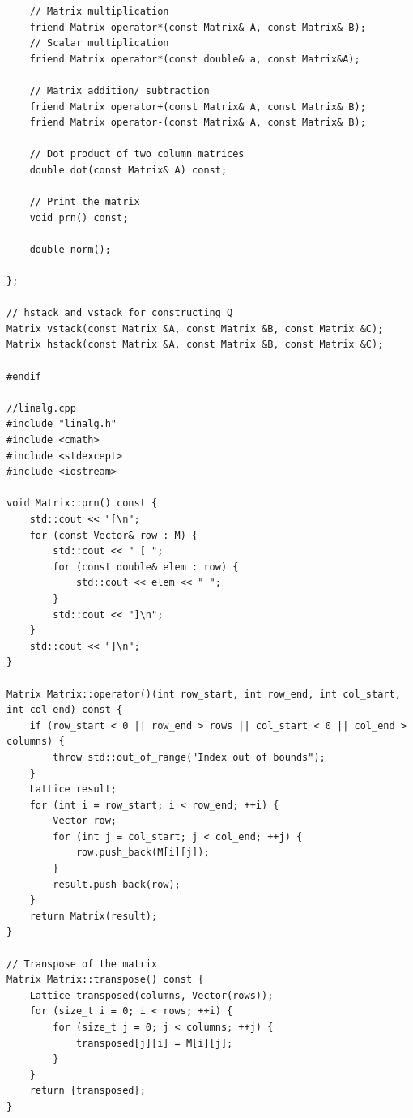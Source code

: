 \documentclass[12pt,twoside]{article}
\begin{document}
\begin{verbatim}
    // Matrix multiplication
    friend Matrix operator*(const Matrix& A, const Matrix& B);
    // Scalar multiplication
    friend Matrix operator*(const double& a, const Matrix&A);

    // Matrix addition/ subtraction
    friend Matrix operator+(const Matrix& A, const Matrix& B);
    friend Matrix operator-(const Matrix& A, const Matrix& B);

    // Dot product of two column matrices
    double dot(const Matrix& A) const;

    // Print the matrix
    void prn() const;

    double norm();

};

// hstack and vstack for constructing Q
Matrix vstack(const Matrix &A, const Matrix &B, const Matrix &C);
Matrix hstack(const Matrix &A, const Matrix &B, const Matrix &C);

#endif

//linalg.cpp
#include "linalg.h"
#include <cmath>
#include <stdexcept>
#include <iostream>

void Matrix::prn() const {
    std::cout << "[\n";
    for (const Vector& row : M) {
        std::cout << " [ ";
        for (const double& elem : row) {
            std::cout << elem << " ";
        }
        std::cout << "]\n";
    }
    std::cout << "]\n";
}

Matrix Matrix::operator()(int row_start, int row_end, int col_start, int col_end) const {
    if (row_start < 0 || row_end > rows || col_start < 0 || col_end > columns) {
        throw std::out_of_range("Index out of bounds");
    }
    Lattice result;
    for (int i = row_start; i < row_end; ++i) {
        Vector row;
        for (int j = col_start; j < col_end; ++j) {
            row.push_back(M[i][j]);
        }
        result.push_back(row);
    }
    return Matrix(result);
}

// Transpose of the matrix
Matrix Matrix::transpose() const {
    Lattice transposed(columns, Vector(rows));
    for (size_t i = 0; i < rows; ++i) {
        for (size_t j = 0; j < columns; ++j) {
            transposed[j][i] = M[i][j];
        }
    }
    return {transposed};
}


\end{verbatim}
\end{document}
